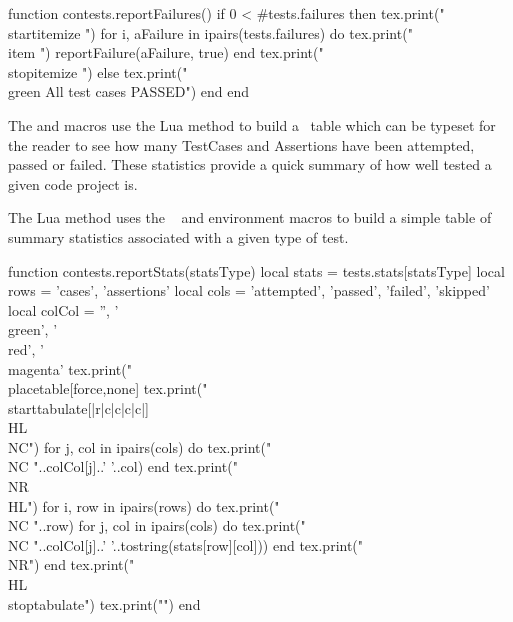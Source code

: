 \startMkIVCode
\def\reportFailures{%
  \directlua{thirddata.contests.reportFailures()}
}
\stopMkIVCode

\startLuaCode
function contests.reportFailures()
  if 0 < #tests.failures then
    tex.print("\\startitemize ")
    for i, aFailure in ipairs(tests.failures) do
      tex.print("\\item ")
      reportFailure(aFailure, true)
    end
    tex.print("\\stopitemize ")
  else
    tex.print("{\\green All test cases PASSED}")
  end
end
\stopLuaCode

The \type{\reportMkIVStats} and \type{\reportLuaStats} macros use the 
 Lua method to build a \ConTeXt\ table which can be 
typeset for the reader to see how many TestCases and Assertions have been 
attempted, passed or failed. These statistics provide a quick summary of 
how well tested a given code project is. 

\startMkIVCode
\def\reportMkIVStats{%
  \directlua{thirddata.contests.reportStats('mkiv')}
}

\def\reportLuaStats{%
  \directlua{thirddata.contests.reportStats('lua')}
}
\stopMkIVCode

The  Lua method uses the \ConTeXt\ \type{\placetable} 
and  environment macros to build a simple table of summary 
statistics associated with a given type of test. 

\startLuaCode
function contests.reportStats(statsType)
  local stats = tests.stats[statsType]
  local rows = { 'cases', 'assertions' }
  local cols =
    { 'attempted', 'passed', 'failed', 'skipped' }
  local colCol = { '', '\\green', '\\red', '\\magenta' }
  tex.print("\\placetable[force,none]{}{%
  tex.print("\\starttabulate[|r|c|c|c|c|]\\HL\\NC")
  for j, col in ipairs(cols) do
    tex.print("\\NC "..colCol[j]..' '..col)
  end
  tex.print("\\NR\\HL")
  for i, row in ipairs(rows) do
    tex.print("\\NC "..row)
    for j, col in ipairs(cols) do
      tex.print("\\NC "..colCol[j]..' '..tostring(stats[row][col]))
    end
    tex.print("\\NR")
  end
  tex.print("\\HL\\stoptabulate")
  tex.print("}")
end
\stopLuaCode

\stopchapter
